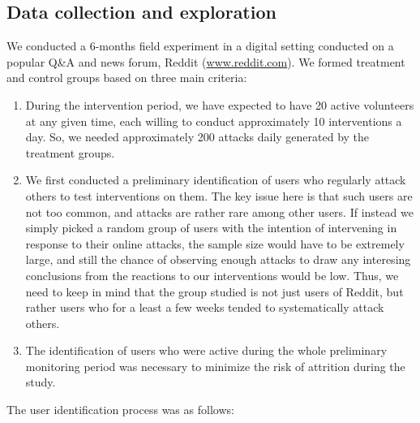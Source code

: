 \documentclass[preprint,12pt]{elsarticle}
\begin{document}
\subsection{Data collection and exploration}\label{subsec:data-and-exploration}









We conducted a 6-months field experiment in a digital setting conducted on a popular Q\&A and news forum, Reddit (\url{www.reddit.com}). We formed treatment and control groups based on three main criteria:

\renewcommand{\labelenumii}{\Roman{enumii}}
 \begin{enumerate}
 \item During the intervention period, we have expected to have 20 active volunteers at any given time, each willing to conduct approximately 10 interventions a day.  So, we needed approximately 200 attacks daily generated by the treatment groups.
\item We first conducted a preliminary identification of users who regularly attack others to test interventions on them. The key issue here is that such users are not too common, and attacks are rather rare among other users. If instead we simply picked a random group of users with the intention of intervening in response to their online attacks, the sample size would have to be extremely large, and still the chance of observing enough attacks to draw any interesing conclusions from the reactions to our interventions would be low. Thus, we need to keep in mind that the group studied is not just users of Reddit, but rather users who for a least a few weeks tended to systematically attack others.

\item The identification of users who were active during the whole preliminary monitoring period was necessary to minimize the risk of attrition during the study. 
 \end{enumerate}

\noindent The user identification process was as follows:
\end{document}
